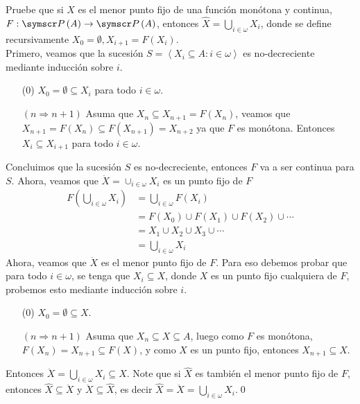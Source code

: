 \item Pruebe que si \(\hat{X}\) es el menor punto fijo de una función monótona y continua, \(F: \fps{A} \rightarrow \fps{A}\), 
    entonces \(\hat{X} = \bigcup_{i \in \omega} X_i\), donde se define recursivamente \(X_0 = \emptyset, X_{i+1} = F(X_i)\). \\
    Primero, veamos que la sucesión \(S = \left\langle X_i \subseteq A: i \in \omega \right\rangle\) es no-decreciente mediante inducción sobre \(i\).
    \vspace{-1ex}
    \begin{enumerate}
        \item[(0)] \(X_0 = \emptyset \subseteq X_i\) para todo \(i \in \omega\).
        \item[\((n \Rightarrow n + 1)\)] Asuma que \(X_n \subseteq X_{n+1} = F(X_n)\), veamos que 
            \(X_{n + 1} = F(X_n) \subseteq F(X_{n+1}) = X_{n+2}\) ya que \(F\) es monótona. Entonces \(X_{i} \subseteq X_{i + 1}\) para todo \(i \in \omega\).
    \end{enumerate}
    Concluimos que la sucesión \(S\) es no-decreciente, entonces \(F\) va a ser continua para \(S\). 
    Ahora, veamos que \(\ddot{X} = \cup_{i \in \omega} X_i\) es un punto fijo de \(F\)
    \[
        \begin{aligned}
            F(\bigcup_{i \in \omega} X_i) 
                &= \bigcup_{i \in \omega} F(X_i) \\
                &= F(X_0) \cup F(X_1) \cup F(X_2) \cup \cdots \\
                &= X_1 \cup X_2 \cup X_3 \cup \cdots \\
                &= \bigcup_{i \in \omega} X_i
        \end{aligned}
    \]
    Ahora, veamos que \(\ddot{X}\) es el menor punto fijo de \(F\). 
    Para eso debemos probar que para todo \(i \in \omega\), se tenga que \(X_i \subseteq X\),
    donde \(X\) es un punto fijo cualquiera de \(F\), probemos esto mediante inducción sobre \(i\).
    \vspace{-1ex}
    \begin{enumerate}
        \item[(0)] \(X_0 = \emptyset \subseteq X\).
        \item[\((n \Rightarrow n + 1)\)] Asuma que \(X_n \subseteq X \subseteq A\), luego como \(F\) es monótona, 
            \(F(X_n) = X_{n+1} \subseteq F(X)\), y como \(X\) es un punto fijo, entonces \(X_{n+1} \subseteq X\).
    \end{enumerate}
    Entonces \(\ddot{X} = \bigcup_{i \in \omega} X_i \subseteq X\).
    Note que si \(\hat{X}\) es también el menor punto fijo de \(F\), entonces \(\hat{X} \subseteq \ddot{X}\) y \(\ddot{X} \subseteq \hat{X}\), 
    es decir \(\hat{X} = \ddot{X} = \bigcup_{i \in \omega} X_i\).\qed{}

